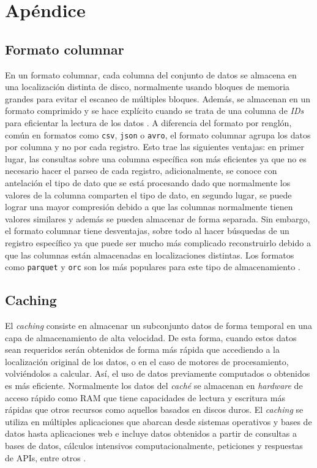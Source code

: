 \chapter{Apéndice}

\section{Formato columnar\label{formatocolumnar}}

\noindent En un formato columnar, cada columna del conjunto de datos se almacena en una localización distinta de disco, normalmente usando bloques de memoria grandes para evitar el escaneo de múltiples bloques. Además, se almacenan en un formato comprimido y se hace explícito cuando se trata de una columna de \textit{IDs} para eficientar la lectura de los datos \cite{column-oriented}. A diferencia del formato por renglón, común en formatos como \texttt{csv}, \texttt{json} o \texttt{avro}, el formato columnar agrupa los datos por columna y no por cada registro. Esto trae las siguientes ventajas: en primer lugar, las consultas sobre una columna específica son más eficientes ya que no es necesario hacer el parseo de cada registro, adicionalmente, se conoce con antelación el tipo de dato que se está procesando dado que normalmente los valores de la columna comparten el tipo de dato, en segundo lugar, se puede lograr una mayor compresión debido a que las columnas normalmente tienen valores similares y además se pueden almacenar de forma separada. Sin embargo, el formato columnar tiene desventajas, sobre todo al hacer búsquedas de un registro específico ya que puede ser mucho más complicado reconstruirlo debido a que las columnas están almacenadas en localizaciones distintas. Los formatos como \texttt{parquet} y \texttt{orc} son los más populares para este tipo de almacenamiento \cite{columnar-storage-blog}.

\section{Caching \label{caching}}

El \textit{caching} consiste en almacenar un subconjunto datos de forma temporal en una capa de almacenamiento de alta velocidad. De esta forma, cuando estos datos sean requeridos serán obtenidos de forma más rápida que accediendo a la localización original de los datos, o en el caso de motores de procesamiento, volviéndolos a calcular. Así, el uso de datos previamente computados o obtenidos es más eficiente. Normalmente los datos del \textit{caché} se almacenan en \textit{hardware} de acceso rápido como RAM que tiene capacidades de lectura y escritura más rápidas que otros recursos como aquellos basados en discos duros. El \textit{caching} se utiliza en múltiples aplicaciones que abarcan desde sistemas operativos y bases de datos hasta aplicaciones web e incluye datos obtenidos a partir de consultas a bases de datos, cálculos intensivos computacionalmente, peticiones y respuestas de APIs, entre otros \cite{aws-caching}. 
